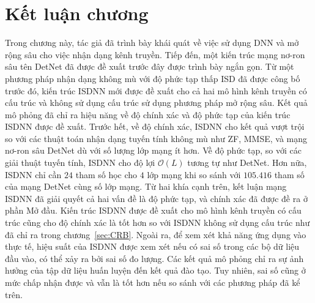 \section{Kết luận chương}

Trong chương này, tác giả đã trình bày khái quát về việc sử dụng DNN và mở rộng sâu cho việc nhận dạng kênh truyền. Tiếp đến, một kiến trúc mạng nơ-ron sâu tên DetNet đã được đề xuất trước đây được trình bày ngắn gọn. Từ một phương pháp nhận dạng không mù với độ phức tạp thấp ISD đã được công bố trước đó, kiến trúc ISDNN mới được đề xuất cho cả hai mô hình kênh truyền có cấu trúc và không sử dụng cấu trúc sử dụng phương pháp mở rộng sâu. Kết quả mô phỏng đã chỉ ra hiệu năng về độ chính xác và độ phức tạp của kiến trúc ISDNN được đề xuất. Trước hết, về độ chính xác, ISDNN cho kết quả vượt trội so với các thuật toán nhận dạng tuyến tính không mù như ZF, MMSE, và mạng nơ-ron sâu DetNet dù với số lượng lớp mạng ít hơn. Về độ phức tạp, so với các giải thuật tuyến tính, ISDNN cho độ lợi $\mathcal{O}(L)$ tương tự như DetNet. Hơn nữa, ISDNN chỉ cần $24$ tham số học cho $4$ lớp mạng khi so sánh với $105.416$ tham số của mạng DetNet cùng số lớp mạng. Từ hai khía cạnh trên, kết luận mạng ISDNN đã giải quyết cả hai vấn đề là độ phức tạp, và chính xác đã được đề ra ở phần Mở đầu. Kiến trúc ISDNN được đề xuất cho mô hình kênh truyền có cấu trúc cũng cho độ chính xác là tốt hơn so với ISDNN không sử dụng cấu trúc như đã chỉ ra trong chương~\ref{sec:CRB}.
Ngoài ra, để xem xét khả năng ứng dụng vào thực tế, hiệu suất của ISDNN được xem xét nếu có sai số trong các bộ dữ liệu đầu vào, có thể xảy ra bởi sai số đo lượng. Các kết quả mô phỏng chỉ ra sự ảnh hưởng của tập dữ liệu huấn luyện đến kết quả đào tạo. Tuy nhiên, sai số cũng ở mức chấp nhận được và vẫn là tốt hơn nếu so sánh với các phương pháp đã kể trên. 